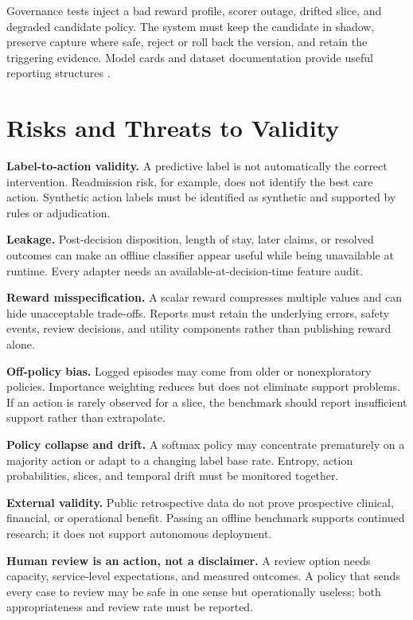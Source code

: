 \documentclass[conference]{IEEEtran}
\begin{document}
Governance tests inject a bad reward profile, scorer outage, drifted
slice, and degraded candidate policy. The system must keep the
candidate in shadow, preserve capture where safe, reject or roll back
the version, and retain the triggering evidence. Model cards and
dataset documentation provide useful reporting structures
\cite{mitchell2019modelcards,gebru2021datasheets}.

\section{Risks and Threats to Validity}
\label{sec:risks}

\textbf{Label-to-action validity.} A predictive label is not
automatically the correct intervention. Readmission risk, for
example, does not identify the best care action. Synthetic action
labels must be identified as synthetic and supported by rules or
adjudication.

\textbf{Leakage.} Post-decision disposition, length of stay, later
claims, or resolved outcomes can make an offline classifier appear
useful while being unavailable at runtime. Every adapter needs an
available-at-decision-time feature audit.

\textbf{Reward misspecification.} A scalar reward compresses multiple
values and can hide unacceptable trade-offs. Reports must retain the
underlying errors, safety events, review decisions, and utility
components rather than publishing reward alone.

\textbf{Off-policy bias.} Logged episodes may come from older or
nonexploratory policies. Importance weighting reduces but does not
eliminate support problems. If an action is rarely observed for a
slice, the benchmark should report insufficient support rather than
extrapolate.

\textbf{Policy collapse and drift.} A softmax policy may concentrate
prematurely on a majority action or adapt to a changing label base
rate. Entropy, action probabilities, slices, and temporal drift must
be monitored together.

\textbf{External validity.} Public retrospective data do not prove
prospective clinical, financial, or operational benefit. Passing an
offline benchmark supports continued research; it does not support
autonomous deployment.

\textbf{Human review is an action, not a disclaimer.} A review option
needs capacity, service-level expectations, and measured outcomes. A
policy that sends every case to review may be safe in one sense but
operationally useless; both appropriateness and review rate must be
reported.
\end{document}
